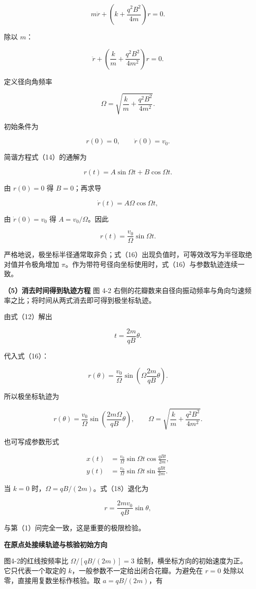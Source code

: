 \documentclass[12pt,a4paper,UTF8]{ctexart}
\begin{document}
\[m\ddot r+\left(k+\frac{q^2B^2}{4m}\right)r=0.\]

除以 \(m\)：

\[\ddot r+\left(\frac km+\frac{q^2B^2}{4m^2}\right)r=0.\]

定义径向角频率

\[\Omega=\sqrt{\frac km+\frac{q^2B^2}{4m^2}}.\]

初始条件为

\[r(0)=0,\qquad \dot r(0)=v_0.\]

简谐方程式（14）的通解为

\[r(t)=A\sin\Omega t+B\cos\Omega t.\]

由 \(r(0)=0\) 得 \(B=0\)；再求导

\[\dot r(t)=A\Omega\cos\Omega t,\]

由 \(\dot r(0)=v_0\) 得 \(A=v_0/\Omega\)。因此

\[\boxed{r(t)=\frac{v_0}{\Omega}\sin\Omega t}.\]

严格地说，极坐标半径通常取非负；式（16）出现负值时，可等效改写为半径取绝对值并令极角增加
\(\pi\)。作为带符号径向坐标使用时，式（16）与参数轨迹连续一致。

\textbf{（5）消去时间得到轨迹方程} 图 4-2
右侧的花瓣数来自径向振动频率与角向匀速频率之比；将时间从两式消去即可得到极坐标轨迹。

由式（12）解出

\[t=\frac{2m}{qB}\theta.\]

代入式（16）：

\[r(\theta)=\frac{v_0}{\Omega}
\sin\left(\Omega\frac{2m}{qB}\theta\right).\]

所以极坐标轨迹为

\[\boxed{
r(\theta)=\frac{v_0}{\Omega}
\sin\left(\frac{2m\Omega}{qB}\theta\right),
\qquad
\Omega=\sqrt{\frac km+\frac{q^2B^2}{4m^2}}
}.\]

也可写成参数形式

\[\boxed{
\begin{aligned}
x(t)&=\frac{v_0}{\Omega}\sin\Omega t
\cos\frac{qBt}{2m},\\
y(t)&=\frac{v_0}{\Omega}\sin\Omega t
\sin\frac{qBt}{2m}.
\end{aligned}}\]

当 \(k=0\) 时，\(\Omega=qB/(2m)\)。式（18）退化为

\[r=\frac{2mv_0}{qB}\sin\theta,\]

与第（1）问完全一致，这是重要的极限检验。

\textbf{在原点处接续轨迹与核验初始方向}

图4-2的红线按频率比 \(\Omega/[qB/(2m)]=3\)
绘制，横坐标方向的初始速度为正。它只代表一个取定的
\(k\)，一般参数不一定给出闭合花瓣。为避免在 \(r=0\)
处除以零，直接用复数坐标作核验。取 \(a=qB/(2m)\)，有
\end{document}
